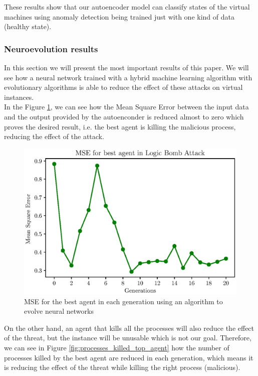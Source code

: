 \documentclass{iosart2c}
\begin{document}
These results show that our autoencoder model can classify states of the virtual machines using anomaly detection being trained just with one kind of data (healthy state).


\subsubsection{Neuroevolution results}

In this section we will present the most important results of this paper. We will see how a neural network trained with a hybrid machine learning algorithm with evolutionary algorithms is able to reduce the effect of these attacks on virtual instances. \\

In the Figure \ref{fig:reward_top_agent}, we can see how the Mean Square Error between the input data and the output provided by the autoenconder is reduced almost to zero which proves the desired result, i.e. the best agent is killing the malicious process, reducing the effect of the attack. \\






\begin{figure}[h!]
\includegraphics[scale=0.5]{figs/results/reward_best_agent_final.eps}
\vspace{-0.5cm}
\caption{MSE for the best agent in each generation using an algorithm to evolve neural networks}
\label{fig:reward_top_agent}
\end{figure}


On the other hand, an agent that kills all the processes will also reduce the effect of the threat, but the instance will be unusable which is not our goal. Therefore, we can see in Figure \ref{fig:processes_killed_top_agent} how the number of processes killed by the best agent are reduced in each generation, which means it is reducing the effect of the threat while killing the right process (malicious).\\
\end{document}
